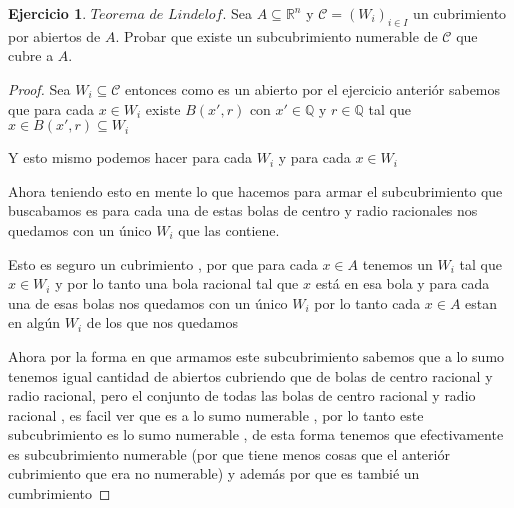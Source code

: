 \documentclass[12pt]{article}
\newcommand{\Q}{\mathbb{Q}}
\newcommand{\R}{\mathbb{R}}
\theoremstyle{definition}
\newtheorem{ej}{Ejercicio}
\begin{document}
\begin{ej}
  $Teorema$ $de$ $Lindelof.$ Sea $A \subseteq \R^n$ y $\mathcal{C} = (W_{i})_{i \in I}$ un cubrimiento por abiertos de $A$. Probar que existe un subcubrimiento numerable de $\mathcal{C}$ que cubre a $A$.

  \begin{proof}
    Sea $W_{i} \subseteq \mathcal{C}$ entonces como es un abierto por el ejercicio anteriór sabemos que para cada $x \in W_{i}$ existe $B(x',r)$ con $x' \in \Q$ y $r \in \Q$ tal que $x \in B(x',r) \subseteq W_{i}$

    Y esto mismo podemos hacer para cada $W_{i}$ y para cada $x \in W_{i}$

    Ahora teniendo esto en mente lo que hacemos para armar el subcubrimiento que buscabamos es para cada una de estas bolas de centro y radio racionales nos quedamos con un único $W_{i}$ que las contiene.

    Esto es seguro un cubrimiento , por que para cada $x \in A$ tenemos un $W_{i}$ tal que $x \in W_{i}$ y por lo tanto una bola racional tal que $x$ está en esa bola y para cada una de esas bolas nos quedamos con un único $W_{i}$ por lo tanto cada $x \in A$ estan en algún $W_{i}$ de los que nos quedamos

    Ahora por la forma en que armamos este subcubrimiento sabemos que a lo sumo tenemos igual cantidad de abiertos cubriendo que de bolas de centro racional y radio racional, pero el conjunto de todas las bolas de centro racional y radio racional , es facil ver que es a lo sumo numerable , por lo tanto este subcubrimiento es lo sumo numerable , de esta forma tenemos que efectivamente es subcubrimiento numerable (por que tiene menos cosas que el anteriór cubrimiento que era no numerable) y además por que es tambié un cumbrimiento
  \end{proof}

\end{ej}
\end{document}
